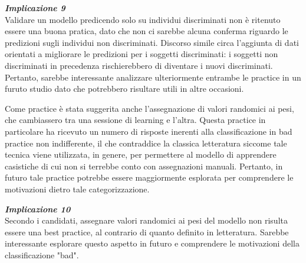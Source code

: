 \begin{center}
    \begin{tcolorbox}[width=400pt, colframe=black, colback=Gray!10]
			\begin{minipage}{\textwidth}
				\textit{\faCaretSquareORight  \textbf{ Implicazione 9}}\\
		     Validare un modello predicendo solo su individui discriminati non è ritenuto essere una buona pratica, dato che non ci sarebbe alcuna conferma riguardo le predizioni sugli individui non discriminati. Discorso simile circa l'aggiunta di dati orientati a migliorare le predizioni per i soggetti discriminati: i soggetti non discriminati in precedenza rischierebbero di diventare i nuovi discriminati. Pertanto, sarebbe interessante analizzare ulteriormente entrambe le practice in un furuto studio dato che potrebbero risultare utili in altre occasioni.
			\end{minipage}
	\end{tcolorbox}
\end{center}

Come practice è stata suggerita anche l'assegnazione di valori randomici ai pesi, che cambiassero tra una sessione di learning e l'altra. Questa practice in particolare ha ricevuto un numero di risposte inerenti alla classificazione in bad practice non indifferente, il che contraddice la classica letteratura siccome tale tecnica viene utilizzata, in genere, per permettere al modello di apprendere casistiche di cui non si terrebbe conto con assegnazioni manuali. Pertanto, in futuro tale practice potrebbe essere maggiormente esplorata per comprendere le motivazioni dietro tale categorizzazione.

\begin{center}
    \begin{tcolorbox}[width=400pt, colframe=black, colback=Gray!10]
			\begin{minipage}{\textwidth}
				\textit{\faCaretSquareORight  \textbf{ Implicazione 10}}\\
		     Secondo i candidati, assegnare valori randomici ai pesi del modello non risulta essere una best practice, al contrario di quanto definito in letteratura. Sarebbe interessante esplorare questo aspetto in futuro e comprendere le motivazioni della classificazione "bad".
			\end{minipage}
	\end{tcolorbox}
\end{center}

